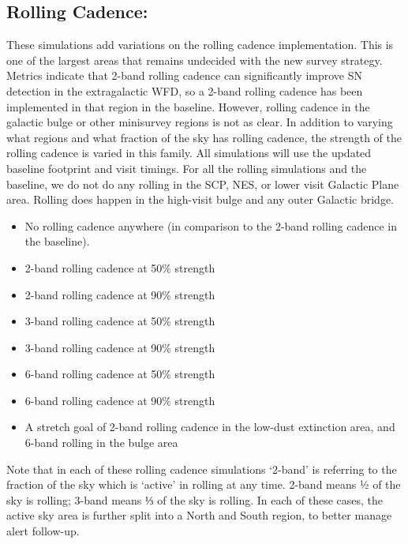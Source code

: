 \subsection{Rolling Cadence:}
These simulations add variations on the rolling cadence implementation. This is one of the largest areas that remains undecided with the new survey strategy. Metrics indicate that 2-band rolling cadence can significantly improve SN detection in the extragalactic WFD, so a 2-band rolling cadence has been implemented in that region in the baseline. However, rolling cadence in the galactic bulge or other minisurvey regions is not as clear. In addition to varying what regions and what fraction of the sky has rolling cadence, the strength of the rolling cadence is varied in this family. All simulations will use the updated baseline footprint and visit timings. For all the rolling simulations and the baseline, we do not do any rolling in the SCP, NES, or lower visit Galactic Plane area. Rolling does happen in the high-visit bulge and any outer Galactic bridge.
\begin{itemize}
\item No rolling cadence anywhere (in comparison to the 2-band rolling cadence in the baseline). 
\item 2-band rolling cadence at 50\% strength
\item 2-band rolling cadence at 90\% strength 
\item 3-band rolling cadence at 50\% strength
\item 3-band rolling cadence at 90\% strength
\item 6-band rolling cadence at 50\% strength
\item 6-band rolling cadence at 90\% strength
\item A stretch goal of 2-band rolling cadence in the low-dust extinction area, and 6-band rolling in the bulge area
\end{itemize}
Note that in each of these rolling cadence simulations ‘2-band’ is referring to the fraction of the sky which is ‘active’ in rolling at any time. 2-band means ½ of the sky is rolling; 3-band means ⅓ of the sky is rolling. In each of these cases, the active sky area is further split into a North and South region, to better manage alert follow-up. 

